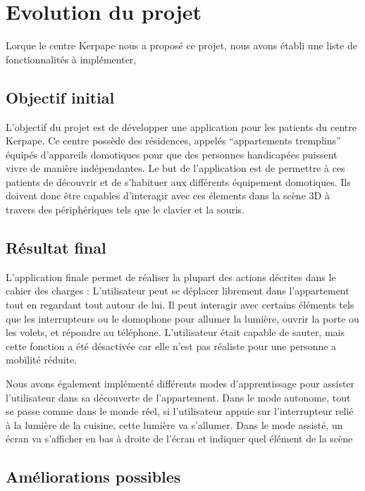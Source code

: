 \section{Evolution du projet}
Lorque le centre Kerpape nous a proposé ce projet, nous avons établi une liste de fonctionnalités à implémenter,

\subsection{Objectif initial}
L'objectif du projet est de développer une application pour les patients du centre Kerpape. Ce centre possède des résidences, appelés \enquote{appartements tremplins} équipés d'appareils domotiques pour que des personnes handicapées puissent vivre de manière indépendantes. Le but de l'application est de permettre à ces patients de découvrir et de s'habituer aux différents équipement domotiques. Ils doivent donc être capables d'interagir avec ces élements dans la scène 3D à travers des périphériques tels que le clavier et la souris.

\subsection{Résultat final}
L'application finale permet de réaliser la plupart des actions décrites dans le cahier des charges : L'utilisateur peut se déplacer librement dans l'appartement tout en regardant tout autour de lui. Il peut interagir avec certains éléments tels que les interrupteurs ou le domophone pour allumer la lumière, ouvrir la porte ou les volets, et répondre au téléphone. L'utilisateur était capable de sauter, mais cette fonction a été désactivée car elle n'est pas réaliste pour une personne a mobilité réduite.

Nous avons également implémenté différents modes d'apprentissage pour assister l'utilisateur dans sa découverte de l'appartement. Dans le mode autonome, tout se passe comme dans le monde réel, si l'utilisateur appuie sur l'interrupteur relié à la lumière de la cuisine, cette lumière va s'allumer. Dans le mode assisté, un écran va s'afficher en bas à droite de l'écran et indiquer quel élément de la scène

\subsection{Améliorations possibles}

